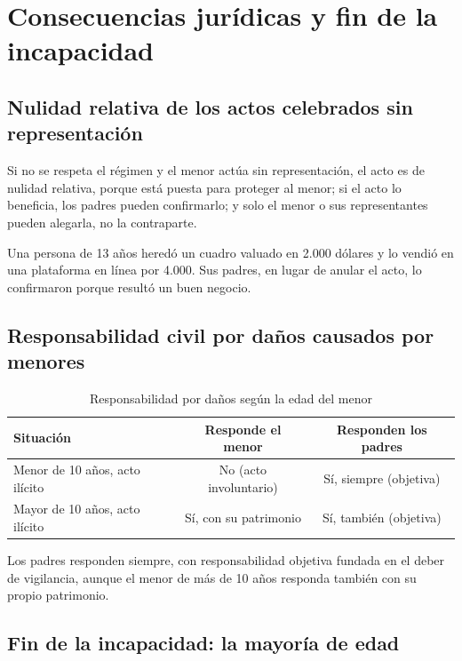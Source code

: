 \documentclass[12pt,oneside]{book}
\begin{document}
\section{Consecuencias jurídicas y fin de la incapacidad}

\subsection{Nulidad relativa de los actos celebrados sin representación}

Si no se respeta el régimen y el menor actúa sin representación, el acto es de nulidad relativa, porque está puesta para proteger al menor; si el acto lo beneficia, los padres pueden confirmarlo; y solo el menor o sus representantes pueden alegarla, no la contraparte.

\begin{ejemplo}
Una persona de 13 años heredó un cuadro valuado en 2.000 dólares y lo vendió en una plataforma en línea por 4.000. Sus padres, en lugar de anular el acto, lo confirmaron porque resultó un buen negocio.
\end{ejemplo}

\subsection{Responsabilidad civil por daños causados por menores}

\begin{table}[H]
\centering
\begin{tabularx}{\textwidth}{Y c c}
\toprule
\textbf{Situación} & \textbf{Responde el menor} & \textbf{Responden los padres} \\
\midrule
Menor de 10 años, acto ilícito & No (acto involuntario) & Sí, siempre (objetiva) \\
Mayor de 10 años, acto ilícito & Sí, con su patrimonio & Sí, también (objetiva) \\
\bottomrule
\end{tabularx}
\caption{Responsabilidad por daños según la edad del menor}
\end{table}

Los padres responden siempre, con responsabilidad objetiva fundada en el deber de vigilancia, aunque el menor de más de 10 años responda también con su propio patrimonio.

\subsection{Fin de la incapacidad: la mayoría de edad}
\end{document}
